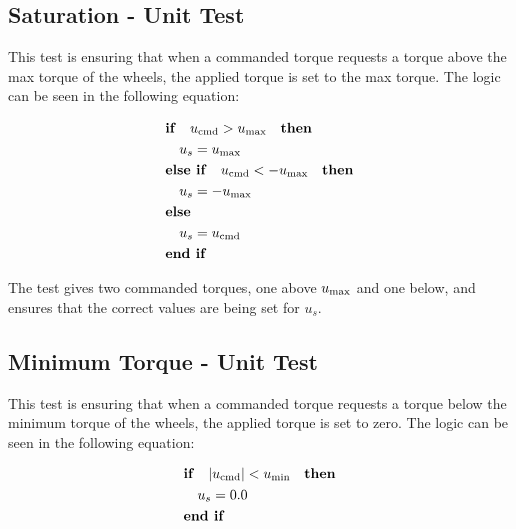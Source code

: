 \subsection{Saturation - Unit Test}

This test is ensuring that when a commanded torque requests a torque above the max torque of the wheels, the applied torque is set to the max torque. The logic can be seen in the following equation:

\begin{equation}
\begin{gathered}
\begin{aligned}
&\textnormal{\textbf{if}}\quad u_{\textnormal{cmd}} > u_{\textnormal{max}}  \quad \textnormal{\textbf{then}}\\
&\quad u_s = u_{\textnormal{max}} \\
&\textnormal{\textbf{else if}}\quad u_{\textnormal{cmd}} < - u_{\textnormal{max}}  \quad \textnormal{\textbf{then}}\\
&\quad u_s =  - u_{\textnormal{max}} \\
&\textnormal{\textbf{else}}\\
&\quad u_s = u_{\textnormal{cmd}}\\
&\textnormal{\textbf{end if}}\\
\end{aligned}
\end{gathered}
\label{eq:ballin}
\end{equation}

The test gives two commanded torques, one above $u_{\textnormal{max}}$ and one below, and ensures that the correct values are being set for $u_s$.

\subsection{Minimum Torque - Unit Test}

This test is ensuring that when a commanded torque requests a torque below the minimum torque of the wheels, the applied torque is set to zero. The logic can be seen in the following equation:

\begin{equation}
\begin{gathered}
\begin{aligned}
&\textnormal{\textbf{if}}\quad \vert u_{\textnormal{cmd}} \vert < u_{\textnormal{min}}  \quad \textnormal{\textbf{then}}\\
&\quad u_s = 0.0 \\
&\textnormal{\textbf{end if}}\\
\end{aligned}
\end{gathered}
\label{eq:ballin2}
\end{equation}

